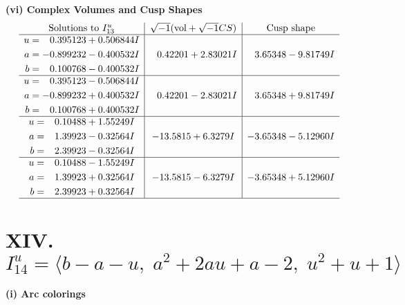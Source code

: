 \documentclass[1p]{elsarticle_modified}
\theoremstyle{definition}
\newcommand{\I}{\sqrt{-1}}
\begin{document}
\newpage\flushleft \textbf{(vi) Complex Volumes and Cusp Shapes}
$$\begin{array}{c|c|c}  
\text{Solutions to }I^u_{13}& \I (\text{vol} + \sqrt{-1}CS) & \text{Cusp shape}\\
 \hline 
\begin{aligned}
u &= \phantom{-}0.395123 + 0.506844 I \\
a &= -0.899232 - 0.400532 I \\
b &= \phantom{-}0.100768 - 0.400532 I\end{aligned}
 & \phantom{-}0.42201 + 2.83021 I & \phantom{-}3.65348 - 9.81749 I \\ \hline\begin{aligned}
u &= \phantom{-}0.395123 - 0.506844 I \\
a &= -0.899232 + 0.400532 I \\
b &= \phantom{-}0.100768 + 0.400532 I\end{aligned}
 & \phantom{-}0.42201 - 2.83021 I & \phantom{-}3.65348 + 9.81749 I \\ \hline\begin{aligned}
u &= \phantom{-}0.10488 + 1.55249 I \\
a &= \phantom{-}1.39923 - 0.32564 I \\
b &= \phantom{-}2.39923 - 0.32564 I\end{aligned}
 & -13.5815 + 6.3279 I & -3.65348 - 5.12960 I \\ \hline\begin{aligned}
u &= \phantom{-}0.10488 - 1.55249 I \\
a &= \phantom{-}1.39923 + 0.32564 I \\
b &= \phantom{-}2.39923 + 0.32564 I\end{aligned}
 & -13.5815 - 6.3279 I & -3.65348 + 5.12960 I\\
 \hline 
 \end{array}$$\newpage\newpage\renewcommand{\arraystretch}{1}
\centering \section*{XIV. $I^u_{14}= \langle b- a- u,\;a^2+2 a u+a-2,\;u^2+u+1 \rangle$}
\flushleft \textbf{(i) Arc colorings}\\
\end{document}
